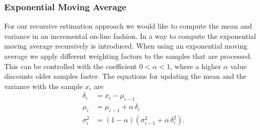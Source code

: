 \subsubsection{Exponential Moving Average}
For our recursive estimation approach we would like to compute
the mean and variance in an incremental on-line fashion.
In \citet{finch2009incremental} a way to 
compute the exponential moving average recursively is introduced.
When using an exponential moving average we apply different weighting
factors to the samples that are processed.
This can be controlled with the coefficient $0 < \alpha < 1$,
where a higher $\alpha$ value discounts older samples faster.
The equations
for updating the mean and the variance with the sample $x_i$ are
\begin{equation}
  \label{eq:ema}  
  \begin{aligned}
    \delta_i &= x_i - \mu_{i-1} \\
    \mu_i &= \mu_{i-1} + \alpha \, \delta_i \\
    \sigma^2_i &= (1 - \alpha) (\sigma^2_{i-1} + \alpha \, \delta^2_i).
  \end{aligned}
\end{equation}



